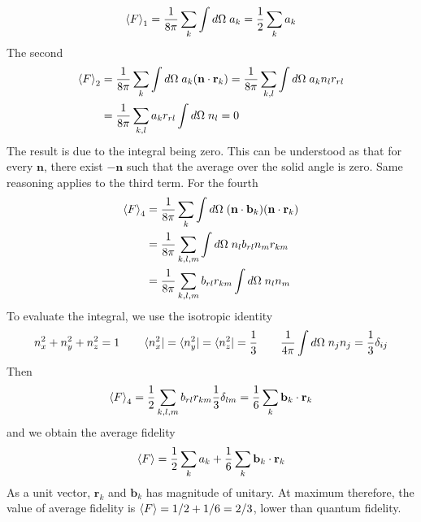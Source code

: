 \documentclass[../../../main.tex]{subfiles}
\begin{document}
\begin{equation*}
  \braket{F }_1 = \frac{1 }{8 \pi } \sum_{k} \int d\Omega\; a_k = \frac{1 }{2 }\sum_{k } a_k
\end{equation*}
The second
\begin{align*}
  \braket{F }_2 & =  \frac{1 }{8 \pi } \sum_{k} \int d\Omega\; a_k(\mathbf{n }\cdot \mathbf{r }_k)
  = \frac{1 }{8 \pi } \sum_{k,l} \int d\Omega\; a_k n_l r_{rl}                                     \\
                & =  \frac{1 }{8 \pi } \sum_{k,l} a_k r_{rl} \int d\Omega\; n_l = 0
\end{align*}
The result is due to the integral being zero.
This can be understood as that for every $\mathbf{n}$, there exist $-\mathbf{n}$ such that the average over the solid angle is zero.
Same reasoning applies to the third term.
For the fourth
\begin{align*}
  \braket{F }_4
   & = \frac{1 }{8 \pi } \sum_{k} \int d\Omega\;  (\mathbf n\cdot\mathbf b_k)(\mathbf{n }\cdot \mathbf{r }_k) \\
   & = \frac{1 }{8 \pi } \sum_{k,l,m} \int d\Omega\;  n_lb_{rl}n_{m}r_{km}                                    \\
   & = \frac{1 }{8 \pi } \sum_{k,l,m} b_{rl}r_{km}\int d\Omega\;  n_ln_{m}
\end{align*}
To evaluate the integral, we use the isotropic identity
\begin{equation*}
  n_x^2 + n_y^2 + n_z^2 = 1\qquad\bra{ n_x^2} = \bra{ n_y^2} = \bra{ n_z^2} = \frac{1}{3}\qquad
  \frac{1 }{4\pi}\int d\Omega\;  n_j n_{j} = \frac{1 }{3} \delta_{ij}
\end{equation*}
Then
\begin{equation*}
  \braket{F }_4
  = \frac{1 }{2} \sum_{k,l,m} b_{rl}r_{km}\frac{1 }{3 } \delta_{lm} =  \frac{1 }{6 }\sum_{k } \mathbf{b }_k \cdot \mathbf{r}_k
\end{equation*}
and we obtain the average fidelity
\begin{equation*}
  \braket{F } = \frac{1 }{2 } \sum_{k}a_k + \frac{1 }{6 }\sum_{k } \mathbf{b }_k \cdot \mathbf{r}_k
\end{equation*}
As a unit vector, $\mathbf{r}_k$ and $\mathbf{b}_k$ has magnitude of unitary.
At maximum therefore, the value of average fidelity is $\braket{F } = 1/2+1/6=2/3$, lower than quantum fidelity.
\end{document}
